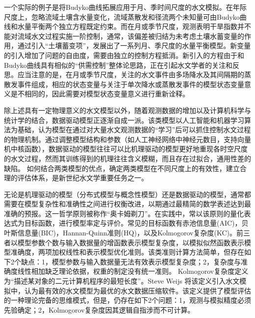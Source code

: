 一个实际的例子是将Budyko曲线拓展应用于月、季时间尺度的水文模拟。在年际尺度上，忽略流域土壤含水量变化，流域蒸散发和径流两个未知量可由Budyko曲线和水量平衡两个独立方程既定约束。而在月或季节尺度，观测表明干旱指数并不能对流域水文过程实施一阶控制\cite{tekleab2011water}，通常，该偏差被归结为未考虑土壤水蓄变量的作用\cite{sankarasubramanian2002annual,sankarasubramanian2003hydroclimatology}，通过引入``土壤蓄变项''，发展出了一系列月、季尺度的水量平衡模型\cite{abcd,xiong1999two,zhang2008water}。新变量的引入增加了问题的自由度，需要由独立的控制方程抵消。新引入的方程由于和Budyko曲线具有相似的``供需控制''整体论思路，正在引起水文学者的关注和反思\cite{wang2014one}。应当注意的是，在月或季节尺度，关注的水文事件由多场降水及其间隔期的蒸散发事件组成，相应的状态变量与关注于单次降水或蒸散发事件的模型状态变量意义是不相同的，因此需要对模型状态变量意义进行重新诠释\cite{hu}。


除上述具有一定物理意义的水文模型以外，随着观测数据的增加以及计算机科学与统计学的结合，数据驱动模型正逐渐自成一派\cite{abrahart2007hydroinformatics}。该类模型以人工智能和机器学习算法为基础，认为模型在通过对大量水文观测数据的``学习''后可以抓住控制水文过程的物理机制\cite{solomatine2008data}。通过调整模型结构和参数（如人工神经网络中神经元数目，支持向量机中核函数），数据驱动的模型往往可以比机理驱动的模型更好地重现各时空尺度的水文过程，然而其训练得到的机理往往含义模糊，而且存在过拟合，通用性差的缺陷。
如何结合两类模型的优点，确定两类模型在不同尺度上的有效性，建立合理的评估体系，是新世纪水文学重要任务之一\cite{todini2007hydrological}。
 
 
 
无论是机理驱动的模型（分布式模型与概念性模型）还是数据驱动的模型，通常都需要在模型复杂性和准确性之间进行权衡改进，以期通过最精简的数学表述达到最准确的预报。这一哲学原则被称作``奥卡姆剃刀''\cite{myung1997applying}。在实践中，常以该原则的量化表达式为目标函数，进行模型率定与评价。常见的目标函数有赤池信息量(AIC)\cite{akaike1974new}，贝叶斯信息量(BIC)\cite{schwarz1978estimating}，Hannan-Quinn准则(HQ)\cite{hannan1979determination}，以及Kolmogorov复杂度(KC)\cite{kolmogorov1968logical}。前三者以模型参数个数与输入数据量的增函数表示模型复杂度，以模拟似然函数表示模型准确度，两项加权线性和表示模型优化准则。该类准则计算方法简单，但存在如下2个缺点：1，模型参数与输入数据量无法有效表示模型复杂度；2，复杂度与准确度线性相加缺乏理论依据，权重的制定没有统一准则。 Kolmogorov复杂度定义为``描述某对象的二元计算机程序的最短长度''\cite{kolmogorov1968logical}。Steve Weijs 将该定义引入水文模拟中，认为最有效的水文模型为最优的水文数据压缩软件\cite{weijs2013data}。该定义提供了模型评估的一种理论完备的思维模式，但是，仍存在如下2个问题：1，观测与模拟精度必须先验确定；2，Kolmogorov复杂度因其逻辑自指涉而不可计算。


